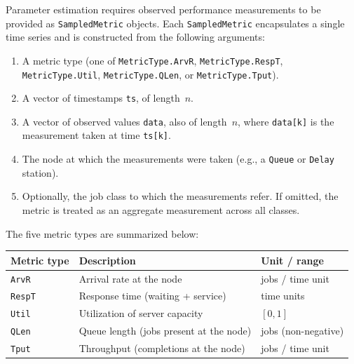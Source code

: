 Parameter estimation requires observed performance measurements to be provided as \texttt{SampledMetric} objects. Each \texttt{SampledMetric} encapsulates a single time series and is constructed from the following arguments:
\begin{enumerate}
\item A metric type (one of \texttt{MetricType.ArvR}, \texttt{MetricType.RespT}, \texttt{MetricType.Util}, \texttt{MetricType.QLen}, or \texttt{MetricType.Tput}).
\item A vector of timestamps \texttt{ts}, of length~$n$.
\item A vector of observed values \texttt{data}, also of length~$n$, where \texttt{data[k]} is the measurement taken at time \texttt{ts[k]}.
\item The node at which the measurements were taken (e.g., a \texttt{Queue} or \texttt{Delay} station).
\item Optionally, the job class to which the measurements refer. If omitted, the metric is treated as an aggregate measurement across all classes.
\end{enumerate}

\noindent The five metric types are summarized below:
\begin{center}
\begin{tabular}{|l|l|l|}
\hline
\textbf{Metric type} & \textbf{Description} & \textbf{Unit / range} \\
\hline
\texttt{ArvR} & Arrival rate at the node & jobs / time unit \\
\texttt{RespT} & Response time (waiting + service) & time units \\
\texttt{Util} & Utilization of server capacity & $[0,1]$ \\
\texttt{QLen} & Queue length (jobs present at the node) & jobs (non-negative) \\
\texttt{Tput} & Throughput (completions at the node) & jobs / time unit \\
\hline
\end{tabular}
\end{center}


